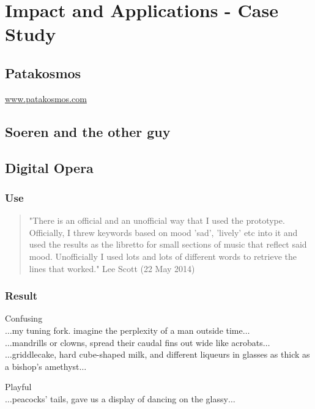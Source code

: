 
\chapter{Impact and Applications - Case Study}
\label{ch:study}

\section{Patakosmos}

\url{www.patakosmos.com}

\section{Soeren and the other guy}

\section{Digital Opera}

\subsection{Use}

\begin{quote}
  "There is an official and an unofficial way that I used the prototype. Officially, I threw keywords based on mood 'sad', 'lively' etc into it and used the results as the libretto for small sections of music that reflect said mood. Unofficially I used lots and lots of different words to retrieve the lines that worked." Lee Scott (22 May 2014)
\end{quote}

\subsection{Result}

Confusing\\
$\ldots$my tuning fork. imagine the perplexity of a man outside time$\ldots$\\
$\ldots$mandrills or clowns, spread their caudal fins out wide like acrobats$\ldots$\\
$\ldots$griddlecake, hard cube-shaped milk, and different liqueurs in glasses as thick as a bishop's amethyst$\ldots$

Playful\\
$\ldots$peacocks' tails, gave us a display of dancing on the glassy$\ldots$

